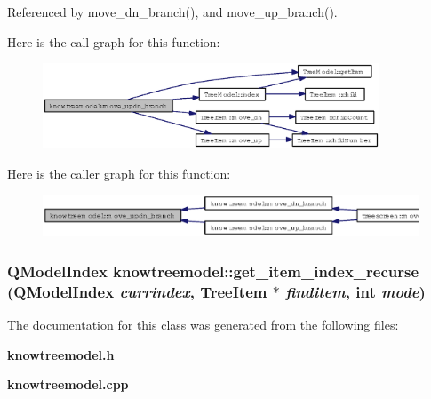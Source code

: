 Referenced by move\_\-dn\_\-branch(), and move\_\-up\_\-branch().

Here is the call graph for this function:\begin{figure}[H]
\begin{center}
\leavevmode
\includegraphics[width=284pt]{classknowtreemodel_6d0493ddfa7010baf5bd713a6f0a8a11_cgraph}
\end{center}
\end{figure}


Here is the caller graph for this function:\begin{figure}[H]
\begin{center}
\leavevmode
\includegraphics[width=342pt]{classknowtreemodel_6d0493ddfa7010baf5bd713a6f0a8a11_icgraph}
\end{center}
\end{figure}
\subsubsection{\setlength{\rightskip}{0pt plus 5cm}QModel\-Index knowtreemodel::get\_\-item\_\-index\_\-recurse (QModel\-Index {\em currindex}, {\bf Tree\-Item} $\ast$ {\em finditem}, int {\em mode})\hspace{0.3cm}{\tt  [private]}}\label{classknowtreemodel_1113f34691048a9002d8a1a1a64e1287}




The documentation for this class was generated from the following files:\begin{CompactItemize}
\item 
{\bf knowtreemodel.h}\item 
{\bf knowtreemodel.cpp}\end{CompactItemize}
